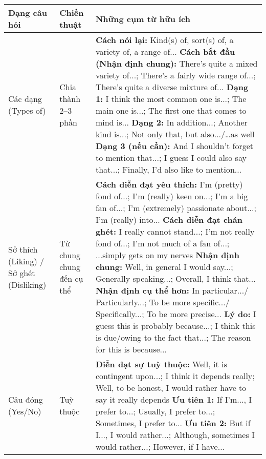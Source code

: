 \begin{tabularx}{\textwidth}{|>{\raggedright\arraybackslash}p{}|
                                 >{\raggedright\arraybackslash}p{}|
                                 >{\raggedright\arraybackslash}X|}
\hline
\textbf{Dạng câu hỏi} & \textbf{Chiến thuật} & \textbf{Những cụm từ hữu ích} \\
\hline

Các dạng (Types of) &
Chia thành 2--3 phần &
\textbf{Cách nói lại:} Kind(s) of, sort(s) of, a variety of, a range of... \newline
\textbf{Cách bắt đầu (Nhận định chung):} There's quite a mixed variety of...; There's a fairly wide range of...; There's quite a diverse mixture of... \newline
\textbf{Dạng 1:} I think the most common one is...; The main one is...; The first one that comes to mind is... \newline
\textbf{Dạng 2:} In addition...; Another kind is...; Not only that, but also.../…as well \newline
\textbf{Dạng 3 (nếu cần):} And I shouldn't forget to mention that...; I guess I could also say that...; Finally, I'd also like to mention... \\
\hline

Sở thích (Liking) / Sở ghét (Disliking) &
Từ chung chung đến cụ thể &
\textbf{Cách diễn đạt yêu thích:} I'm (pretty) fond of...; I'm (really) keen on...; I'm a big fan of...; I'm (extremely) passionate about...; I'm (really) into... \newline
\textbf{Cách diễn đạt chán ghét:} I really cannot stand...; I'm not really fond of...; I'm not much of a fan of...; ...simply gets on my nerves \newline
\textbf{Nhận định chung:} Well, in general I would say...; Generally speaking...; Overall, I think that... \newline
\textbf{Nhận định cụ thể hơn:} In particular.../ Particularly...; To be more specific.../ Specifically...; To be more precise... \newline
\textbf{Lý do:} I guess this is probably because...; I think this is due/owing to the fact that...; The reason for this is because... \\
\hline

Câu đóng (Yes/No) &
Tuỳ thuộc &
\textbf{Diễn đạt sự tuỳ thuộc:} Well, it is contingent upon...; I think it depends really; Well, to be honest, I would rather have to say it really depends \newline
\textbf{Ưu tiên 1:} If I'm..., I prefer to...; Usually, I prefer to...; Sometimes, I prefer to... \newline
\textbf{Ưu tiên 2:} But if I..., I would rather...; Although, sometimes I would rather...; However, if I have... \\
\hline


\end{tabularx}
